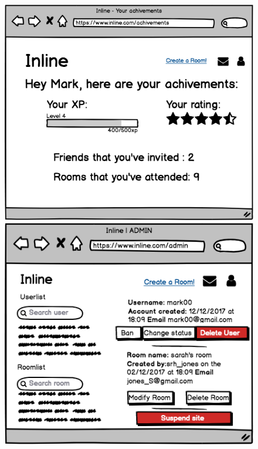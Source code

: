 	
	\begin{figure}[H]
	\centering
		\begin{minipage}[b]{0.45\textwidth}
			\includegraphics[width=\textwidth]{./Mockup/achivements.png}
		\end{minipage}
		\hfill
		\begin{minipage}[b]{0.45\textwidth}
			\includegraphics[width=\textwidth]{./Mockup/admin.png}
		\end{minipage}
	\end{figure}


